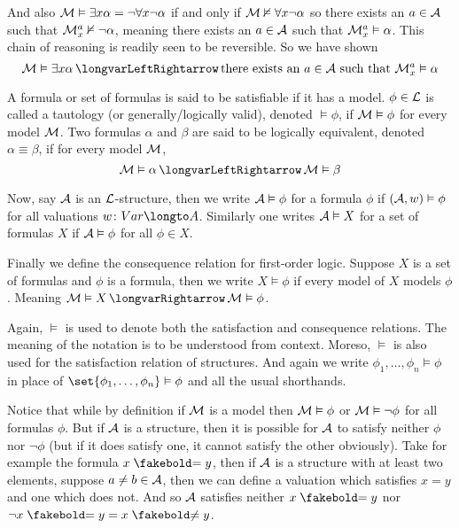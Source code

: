 And also ${\cal M}\vDash\exists x\alpha=\neg\forall x\neg\alpha$ if and only if ${\cal M}\nvDash\forall x\neg\alpha$ so there exists an $a\in{\cal A}$ such that ${\cal M}^a_x\nvDash\neg\alpha$,
meaning there exists an $a\in{\cal A}$ such that ${\cal M}^a_x\vDash\alpha$.
This chain of reasoning is readily seen to be reversible.
So we have shown
$$ {\cal M}\vDash\exists x\alpha \iff \hbox{there exists an $a\in{\cal A}$ such that }{\cal M}^a_x\vDash\alpha $$

\bdefn

    A formula or set of formulas is said to be {\emphcolor satisfiable} if it has a model.
    $\phi\in{\cal L}$ is called a {\emphcolor tautology} (or {\emphcolor generally/logically valid}), denoted $\vDash\phi$, if ${\cal M}\vDash\phi$ for every model ${\cal M}$.
    Two formulas $\alpha$ and $\beta$ are said to be {\emphcolor logically equivalent}, denoted $\alpha\equiv\beta$, if for every model ${\cal M}$,
    $$ {\cal M}\vDash\alpha \iff {\cal M}\vDash\beta $$

    Now, say ${\cal A}$ is an ${\cal L}$-structure, then we write ${\cal A}\vDash\phi$ for a formula $\phi$ if $({\cal A},w)\vDash\phi$ for all valuations $w\colon\Var\longto A$.
    Similarly one writes ${\cal A}\vDash X$ for a set of formulas $X$ if ${\cal A}\vDash\phi$ for all $\phi\in X$.

\edefn

\bdefn

    Finally we define the {\emphcolor consequence relation} for first-order logic.
    Suppose $X$ is a set of formulas and $\phi$ is a formula, then we write $X\vDash\phi$ if every model of $X$ models $\phi$.
    Meaning ${\cal M}\vDash X\implies{\cal M}\vDash\phi$.

\edefn

Again, $\vDash$ is used to denote both the satisfaction and consequence relations.
The meaning of the notation is to be understood from context.
Moreso, $\vDash$ is also used for the satisfaction relation of structures.
And again we write $\phi_1,\dots,\phi_n\vDash\phi$ in place of $\set{\phi_1,\dots,\phi_n}\vDash\phi$ and all the usual shorthands.

Notice that while by definition if ${\cal M}$ is a model then ${\cal M}\vDash\phi$ or ${\cal M}\vDash\neg\phi$ for all formulas $\phi$.
But if ${\cal A}$ is a structure, then it is possible for ${\cal A}$ to satisfy neither $\phi$ nor $\neg\phi$ (but if it does satisfy one, it cannot satisfy the other obviously).
Take for example the formula $x\eq y$, then if ${\cal A}$ is a structure with at least two elements, suppose $a\neq b\in{\cal A}$, then we can define a valuation which satisfies $x=y$ and one which does not.
And so ${\cal A}$ satisfies neither $x\eq y$ nor $\neg x\eq y=x\neqb y$.

